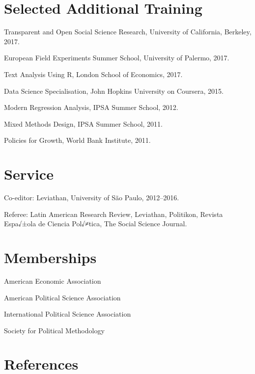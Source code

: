 \documentclass[a4paper]{article}
\renewenvironment{itemize}{
  \begin{list}{}{
    \setlength{\leftmargin}{1.5em}
  }
}{
  \end{list}
}
\begin{document}
\section*{Selected Additional Training}

\begin{itemize}
    \item Transparent and Open Social Science Research, University of California, Berkeley, 2017. %
	\item European Field Experiments Summer School, University of Palermo, 2017.
	\item Text Analysis Using R, London School of Economics, 2017.
	\item Data Science Specialisation, John Hopkins University on Coursera, 2015.
	\item Modern Regression Analysis, IPSA Summer School, 2012.
	\item Mixed Methods Design, IPSA Summer School, 2011.
	\item Policies for Growth, World Bank Institute, 2011.
\end{itemize}

\section*{Service}

\begin{itemize}
	\item Co-editor: Leviathan, University of S\~{a}o Paulo, 2012--2016.
	\item Referee: Latin American Research Review, Leviathan, Politikon, Revista Espa√±ola de Ciencia Pol√≠tica, The Social Science Journal.
\end{itemize}

\section*{Memberships}

\begin{itemize}
    \item American Economic Association
    \item American Political Science Association
    \item International Political Science Association
    \item Society for Political Methodology
\end{itemize}

\section*{References}
\end{document}
